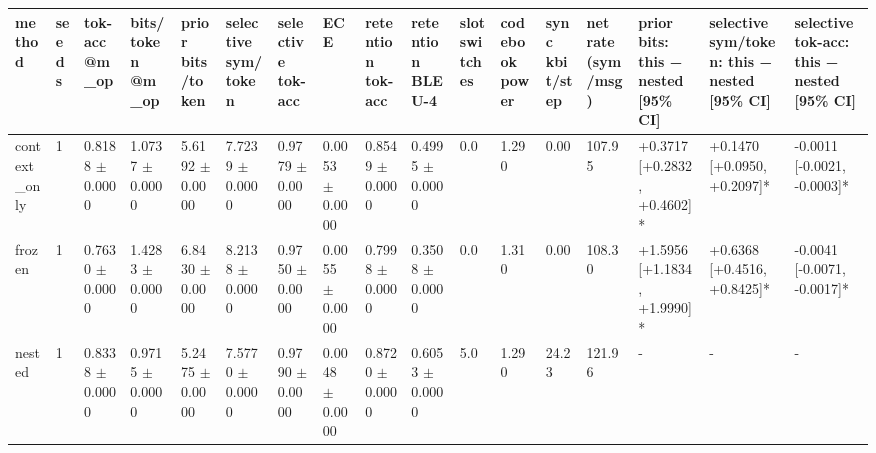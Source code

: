 \begin{tabular}{lllllllllllllllll}
\hline
method & seeds & tok-acc @m\_op & bits/token @m\_op & prior bits/token & selective sym/token & selective tok-acc & ECE & retention tok-acc & retention BLEU-4 & slot switches & codebook power & sync kbit/step & net rate (sym/msg) & prior bits: this − nested [95\% CI] & selective sym/token: this − nested [95\% CI] & selective tok-acc: this − nested [95\% CI] \\
\hline
context\_only & 1 & 0.8188 $\pm$ 0.0000 & 1.0737 $\pm$ 0.0000 & 5.6192 $\pm$ 0.0000 & 7.7239 $\pm$ 0.0000 & 0.9779 $\pm$ 0.0000 & 0.0053 $\pm$ 0.0000 & 0.8549 $\pm$ 0.0000 & 0.4995 $\pm$ 0.0000 & 0.0 & 1.290 & 0.00 & 107.95 & +0.3717 [+0.2832, +0.4602]* & +0.1470 [+0.0950, +0.2097]* & -0.0011 [-0.0021, -0.0003]* \\
frozen & 1 & 0.7630 $\pm$ 0.0000 & 1.4283 $\pm$ 0.0000 & 6.8430 $\pm$ 0.0000 & 8.2138 $\pm$ 0.0000 & 0.9750 $\pm$ 0.0000 & 0.0055 $\pm$ 0.0000 & 0.7998 $\pm$ 0.0000 & 0.3508 $\pm$ 0.0000 & 0.0 & 1.310 & 0.00 & 108.30 & +1.5956 [+1.1834, +1.9990]* & +0.6368 [+0.4516, +0.8425]* & -0.0041 [-0.0071, -0.0017]* \\
nested & 1 & 0.8338 $\pm$ 0.0000 & 0.9715 $\pm$ 0.0000 & 5.2475 $\pm$ 0.0000 & 7.5770 $\pm$ 0.0000 & 0.9790 $\pm$ 0.0000 & 0.0048 $\pm$ 0.0000 & 0.8720 $\pm$ 0.0000 & 0.6053 $\pm$ 0.0000 & 5.0 & 1.290 & 24.23 & 121.96 & - & - & - \\
\hline
\end{tabular}
